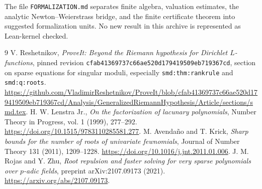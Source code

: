The file \texttt{FORMALIZATION.md} separates finite algebra, valuation
estimates, the analytic Newton--Weierstrass bridge, and the finite
certificate theorem into suggested formalization units. No new result
in this archive is represented as Lean-kernel checked.

\begin{thebibliography}{9}
 V. Reshetnikov, \emph{ProveIt: Beyond the Riemann hypothesis
for Dirichlet $L$-functions}, pinned revision
\texttt{cfab41369737c66ae520d179419509eb719367cd}, section on sparse equations
for singular moduli, especially \texttt{smd:thm:rankrule} and
\texttt{smd:q:roots}.\newline
\url{https://github.com/VladimirReshetnikov/ProveIt/blob/cfab41369737c66ae520d179419509eb719367cd/Analysis/GeneralizedRiemannHypothesis/Article/sections/smd.tex}.
 H. W. Lenstra Jr., \emph{On the factorization of lacunary
polynomials}, Number Theory in Progress, vol. 1 (1999), 277--292.
\url{https://doi.org/10.1515/9783110285581.277}.
 M. Avenda\~no and T. Krick, \emph{Sharp bounds for the
number of roots of univariate fewnomials}, Journal of Number Theory
131 (2011), 1209--1228. \url{https://doi.org/10.1016/j.jnt.2011.01.006}.
 J. M. Rojas and Y. Zhu, \emph{Root repulsion and faster
solving for very sparse polynomials over $p$-adic fields}, preprint
arXiv:2107.09173 (2021). \url{https://arxiv.org/abs/2107.09173}.
\end{thebibliography}


